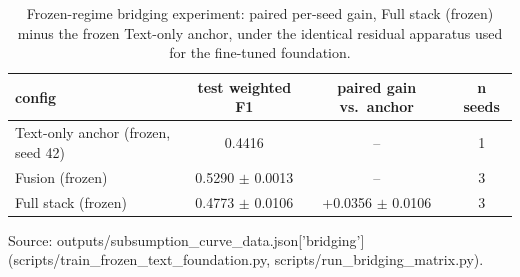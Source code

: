 \begin{table}[t]
\centering
\caption{Frozen-regime bridging experiment: paired per-seed gain, Full stack (frozen) minus the frozen Text-only anchor, under the identical residual apparatus used for the fine-tuned foundation.}
\label{tab:frozen-bridging}
\begin{tabular}{lccc}
\toprule
config & test weighted F1 & paired gain vs.\ anchor & n seeds \\
\midrule
Text-only anchor (frozen, seed 42) & 0.4416 & -- & 1 \\
Fusion (frozen) & 0.5290 $\pm$ 0.0013 & -- & 3 \\
Full stack (frozen) & 0.4773 $\pm$ 0.0106 & +0.0356 $\pm$ 0.0106 & 3 \\
\bottomrule
\end{tabular}
\par\footnotesize Source: outputs/subsumption\_curve\_data.json['bridging'] (scripts/train\_frozen\_text\_foundation.py, scripts/run\_bridging\_matrix.py).
\end{table}

